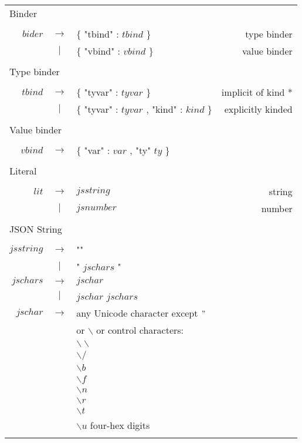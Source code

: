 \documentclass{article}
\begin{document}
\begin{footnotesize}
\begin{longtable}{ r c l r }
\multicolumn{4}{l}{Binder}			 \\
\\[0.01in]
$bider$		& $ \rightarrow $	& $\{$ "tbind" : $tbind$ $\}$											& type binder		\\
		& $ | $			& $\{$ "vbind" : $vbind$ $\}$											& value binder		\\
\\[0.01in]

\multicolumn{4}{l}{Type binder}			 \\
\\[0.01in]
$tbind$		& $ \rightarrow $	& $\{$ "tyvar" : $tyvar$ $\}$											& implicit of kind * 	\\
		& $ | $			& $\{$ "tyvar" : $tyvar$ , "kind" : $kind$ $\}$									& explicitly kinded	\\
\\[0.01in]

\multicolumn{4}{l}{Value binder}			 \\
\\[0.01in]
$vbind$		& $ \rightarrow $	& $\{$ "var" : $var$ , "ty" $ty$ $\}$ 										& \\
\\[0.01in]

\multicolumn{4}{l}{Literal}			 \\
\\[0.01in]
$lit$		& $ \rightarrow $	& $jsstring$													& string 		\\ 
		& $ | $			& $jsnumber$													& number		\\
\\[0.01in]

\multicolumn{4}{l}{JSON String}			 \\
\\[0.01in]
$jsstring$	& $ \rightarrow $	& ""														& \\
		& $ | $			& " $jschars$ "													& \\
$jschars$	& $ \rightarrow $	& $jschar$													& \\
		& $ | $			& $jschar$ $jschars$												& \\
$jschar$	& $ \rightarrow $	& any Unicode character except $"$ 										& \\ 
		&			& or $\backslash$ or control characters: 									& \\
		&			& $\backslash\backslash$											& \\
		&			& $\backslash /$ 												& \\
		&			& $\backslash b$ 												& \\
		& 			& $\backslash f$ 												& \\
		&			& $\backslash n$												& \\
		& 			& $\backslash r$ 												& \\
		&			& $\backslash t$ 												& \\
		& 			& $\backslash u$ four-hex digits\\
\\[0.01in]


\end{longtable}
\end{footnotesize}
\end{document}
